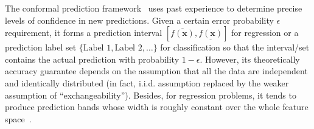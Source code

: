 The conformal prediction framework~\cite{Vovk:2005,vovk2009line} uses past experience to determine precise levels  of confidence in new predictions. Given a certain error probability $\epsilon$ requirement, it forms a prediction interval $[\overline{f(\mathbf x)},\underline{{f(\mathbf x)}}]$ for regression or a  prediction label set $\{\mbox{Label 1},\mbox{Label 2},\ldots \}$ for classification  so that the interval/set contains the actual prediction with probability $1-\epsilon$. However, its theoretically accuracy guarantee depends on the assumption that all the data are independent and identically distributed (in fact, i.i.d. assumption replaced by the weaker assumption of ``exchangeability'').  Besides, for regression problems, it tends to  produce prediction bands  whose width is roughly constant over the whole feature space~\cite{lei2018distribution}.


















